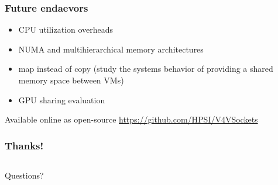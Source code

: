 \documentclass[red,slidestop,notes,compress,mathserif]{beamer}
\begin{document}
\begin{frame}
\frametitle{Future endaevors}
\begin{itemize}
\item CPU utilization overheads
\item NUMA and multihierarchical memory architectures
\item map instead of copy (study the systems behavior of providing a shared memory space between VMs)
\item GPU sharing evaluation
\end{itemize}

Available online as open-source \url{https://github.com/HPSI/V4VSockets}

\end{frame}
%
\begin{frame}
\frametitle{Thanks!}
                \vfill%
\begin{columns}
        \begin{center}
        \begin{center}
                        {\LARGE Questions?}
        \end{center}
                \vfill%
        \end{center}
\end{columns}
                \vfill%
\end{frame}
\end{document}
